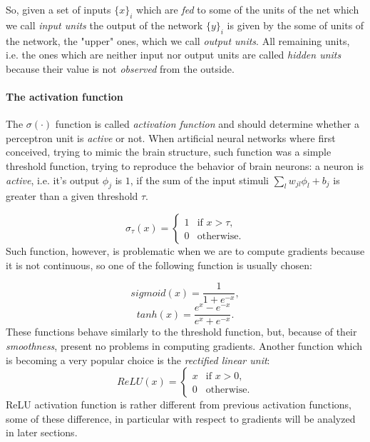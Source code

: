 So, given a set of inputs $\{x\}_i$ which are \textit{fed} to some of the units of the net which we call \textit{input units} the output of the network $\{y\}_i$ is given by the
some of units of the network, the "upper" ones, which we call \textit{output units}. All remaining units, i.e. the ones which are neither input nor output units
are called \textit{hidden units} because their value is not \textit{observed} from the outside.

\paragraph{The activation function}
The $\sigma(\cdot)$ function is called \textit{activation function} and should determine whether a perceptron unit is \textit{active} or not. When artificial neural networks where first conceived,
trying to mimic the brain structure, such function was a simple threshold function, trying to reproduce the behavior of brain neurons: a neuron is \textit{active}, i.e. it's output $\phi_j$ is $1$, if
the sum of the input stimuli $\sum_l w_{jl}\phi_l +b_j$ is greater than a given threshold $\tau$.

\begin{equation}
  \sigma_{\tau}(x)=\begin{cases}
    1 & \text{if $x>\tau$},\\
    0 & \text{otherwise}.
  \end{cases}
\end{equation}
Such function, however, is problematic when we are to compute gradients because it is not continuous, so one of the following function is usually chosen:

\begin{equation}
 sigmoid(x)=\frac{1}{1+e^{-x}},
\end{equation}
\begin{equation}
 tanh(x)=\frac{e^x-e^{-x}}{e^x+e^{-x}}.
\end{equation}
These functions behave similarly to the threshold function, but, because of their \textit{smoothness}, present no problems in computing gradients.
Another function which is becoming a very popular choice is the \textit{rectified linear unit}:
\begin{equation}
  ReLU(x)=\begin{cases}
    x & \text{if $x>0$},\\
    0 & \text{otherwise}.
  \end{cases}
\end{equation}
ReLU activation function is rather different from previous activation functions, some of these difference, in particular with respect to gradients will be analyzed in later sections.

